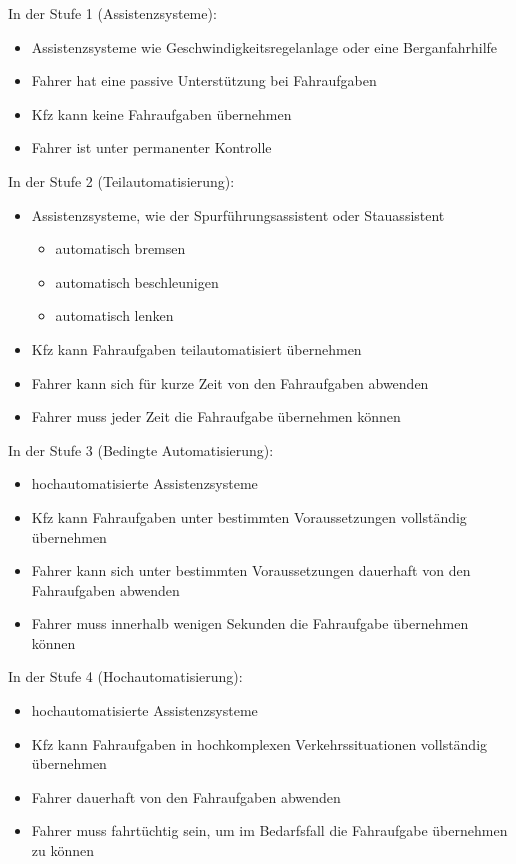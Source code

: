 In der Stufe 1 (Assistenzsysteme):
\begin{itemize}
	\item Assistenzsysteme wie Geschwindigkeitsregelanlage oder eine Berganfahrhilfe
	\item Fahrer hat eine passive Unterstützung bei Fahraufgaben
	\item \ac{Kfz} kann keine Fahraufgaben übernehmen
	\item Fahrer ist unter permanenter Kontrolle
\end{itemize}

In der Stufe 2 (Teilautomatisierung):
\begin{itemize}
	\item Assistenzsysteme, wie der Spurführungsassistent oder Stauassistent
	      \begin{itemize}
		      \item automatisch bremsen
		      \item automatisch beschleunigen
		      \item automatisch lenken
	      \end{itemize}
	\item \ac{Kfz} kann Fahraufgaben teilautomatisiert übernehmen
	\item Fahrer kann sich für kurze Zeit von den Fahraufgaben abwenden
	\item Fahrer muss jeder Zeit die Fahraufgabe übernehmen können
\end{itemize}

In der Stufe 3 (Bedingte Automatisierung):
\begin{itemize}
	\item hochautomatisierte Assistenzsysteme
	\item \ac{Kfz} kann Fahraufgaben unter bestimmten Voraussetzungen vollständig übernehmen
	\item Fahrer kann sich unter bestimmten Voraussetzungen dauerhaft von den Fahraufgaben abwenden
	\item Fahrer muss innerhalb wenigen Sekunden die Fahraufgabe übernehmen können
\end{itemize}

In der Stufe 4 (Hochautomatisierung):
\begin{itemize}
	\item hochautomatisierte Assistenzsysteme
	\item \ac{Kfz} kann Fahraufgaben in hochkomplexen Verkehrssituationen vollständig übernehmen
	\item Fahrer dauerhaft von den Fahraufgaben abwenden
	\item Fahrer muss fahrtüchtig sein, um im Bedarfsfall die Fahraufgabe übernehmen zu können
\end{itemize}

